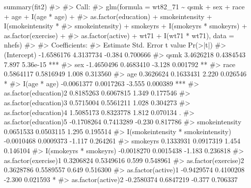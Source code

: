 \documentclass[
  10pt,
  a4paper,
]{book}
\newenvironment{Shaded}{\begin{snugshade}}{\end{snugshade}}
\newcommand{\CommentTok}[1]{\textcolor[rgb]{0.37,0.37,0.37}{#1}}
\newcommand{\FunctionTok}[1]{\textcolor[rgb]{0.28,0.35,0.67}{#1}}
\newcommand{\NormalTok}[1]{\textcolor[rgb]{0.00,0.46,0.62}{#1}}
\begin{document}
\begin{Shaded}
\begin{Highlighting}[]
\FunctionTok{summary}\NormalTok{(fit2)}
\CommentTok{\#\textgreater{} }
\CommentTok{\#\textgreater{} Call:}
\CommentTok{\#\textgreater{} glm(formula = wt82\_71 \textasciitilde{} qsmk + sex + race + age + I(age * age) + }
\CommentTok{\#\textgreater{}     as.factor(education) + smokeintensity + I(smokeintensity * }
\CommentTok{\#\textgreater{}     smokeintensity) + smokeyrs + I(smokeyrs * smokeyrs) + as.factor(exercise) + }
\CommentTok{\#\textgreater{}     as.factor(active) + wt71 + I(wt71 * wt71), data = nhefs)}
\CommentTok{\#\textgreater{} }
\CommentTok{\#\textgreater{} Coefficients:}
\CommentTok{\#\textgreater{}                                      Estimate Std. Error t value Pr(\textgreater{}|t|)    }
\CommentTok{\#\textgreater{} (Intercept)                        {-}1.6586176  4.3137734  {-}0.384 0.700666    }
\CommentTok{\#\textgreater{} qsmk                                3.4626218  0.4384543   7.897 5.36e{-}15 ***}
\CommentTok{\#\textgreater{} sex                                {-}1.4650496  0.4683410  {-}3.128 0.001792 ** }
\CommentTok{\#\textgreater{} race                                0.5864117  0.5816949   1.008 0.313560    }
\CommentTok{\#\textgreater{} age                                 0.3626624  0.1633431   2.220 0.026546 *  }
\CommentTok{\#\textgreater{} I(age * age)                       {-}0.0061377  0.0017263  {-}3.555 0.000389 ***}
\CommentTok{\#\textgreater{} as.factor(education)2               0.8185263  0.6067815   1.349 0.177546    }
\CommentTok{\#\textgreater{} as.factor(education)3               0.5715004  0.5561211   1.028 0.304273    }
\CommentTok{\#\textgreater{} as.factor(education)4               1.5085173  0.8323778   1.812 0.070134 .  }
\CommentTok{\#\textgreater{} as.factor(education)5              {-}0.1708264  0.7413289  {-}0.230 0.817786    }
\CommentTok{\#\textgreater{} smokeintensity                      0.0651533  0.0503115   1.295 0.195514    }
\CommentTok{\#\textgreater{} I(smokeintensity * smokeintensity) {-}0.0010468  0.0009373  {-}1.117 0.264261    }
\CommentTok{\#\textgreater{} smokeyrs                            0.1333931  0.0917319   1.454 0.146104    }
\CommentTok{\#\textgreater{} I(smokeyrs * smokeyrs)             {-}0.0018270  0.0015438  {-}1.183 0.236818    }
\CommentTok{\#\textgreater{} as.factor(exercise)1                0.3206824  0.5349616   0.599 0.548961    }
\CommentTok{\#\textgreater{} as.factor(exercise)2                0.3628786  0.5589557   0.649 0.516300    }
\CommentTok{\#\textgreater{} as.factor(active)1                 {-}0.9429574  0.4100208  {-}2.300 0.021593 *  }
\CommentTok{\#\textgreater{} as.factor(active)2                 {-}0.2580374  0.6847219  {-}0.377 0.706337    }

\end{Highlighting}
\end{Shaded}
\end{document}

